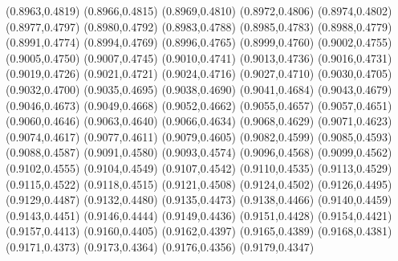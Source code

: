 \PST@Filltriangle(0.8963,0.4819)
\PST@Filltriangle(0.8966,0.4815)
\PST@Filltriangle(0.8969,0.4810)
\PST@Filltriangle(0.8972,0.4806)
\PST@Filltriangle(0.8974,0.4802)
\PST@Filltriangle(0.8977,0.4797)
\PST@Filltriangle(0.8980,0.4792)
\PST@Filltriangle(0.8983,0.4788)
\PST@Filltriangle(0.8985,0.4783)
\PST@Filltriangle(0.8988,0.4779)
\PST@Filltriangle(0.8991,0.4774)
\PST@Filltriangle(0.8994,0.4769)
\PST@Filltriangle(0.8996,0.4765)
\PST@Filltriangle(0.8999,0.4760)
\PST@Filltriangle(0.9002,0.4755)
\PST@Filltriangle(0.9005,0.4750)
\PST@Filltriangle(0.9007,0.4745)
\PST@Filltriangle(0.9010,0.4741)
\PST@Filltriangle(0.9013,0.4736)
\PST@Filltriangle(0.9016,0.4731)
\PST@Filltriangle(0.9019,0.4726)
\PST@Filltriangle(0.9021,0.4721)
\PST@Filltriangle(0.9024,0.4716)
\PST@Filltriangle(0.9027,0.4710)
\PST@Filltriangle(0.9030,0.4705)
\PST@Filltriangle(0.9032,0.4700)
\PST@Filltriangle(0.9035,0.4695)
\PST@Filltriangle(0.9038,0.4690)
\PST@Filltriangle(0.9041,0.4684)
\PST@Filltriangle(0.9043,0.4679)
\PST@Filltriangle(0.9046,0.4673)
\PST@Filltriangle(0.9049,0.4668)
\PST@Filltriangle(0.9052,0.4662)
\PST@Filltriangle(0.9055,0.4657)
\PST@Filltriangle(0.9057,0.4651)
\PST@Filltriangle(0.9060,0.4646)
\PST@Filltriangle(0.9063,0.4640)
\PST@Filltriangle(0.9066,0.4634)
\PST@Filltriangle(0.9068,0.4629)
\PST@Filltriangle(0.9071,0.4623)
\PST@Filltriangle(0.9074,0.4617)
\PST@Filltriangle(0.9077,0.4611)
\PST@Filltriangle(0.9079,0.4605)
\PST@Filltriangle(0.9082,0.4599)
\PST@Filltriangle(0.9085,0.4593)
\PST@Filltriangle(0.9088,0.4587)
\PST@Filltriangle(0.9091,0.4580)
\PST@Filltriangle(0.9093,0.4574)
\PST@Filltriangle(0.9096,0.4568)
\PST@Filltriangle(0.9099,0.4562)
\PST@Filltriangle(0.9102,0.4555)
\PST@Filltriangle(0.9104,0.4549)
\PST@Filltriangle(0.9107,0.4542)
\PST@Filltriangle(0.9110,0.4535)
\PST@Filltriangle(0.9113,0.4529)
\PST@Filltriangle(0.9115,0.4522)
\PST@Filltriangle(0.9118,0.4515)
\PST@Filltriangle(0.9121,0.4508)
\PST@Filltriangle(0.9124,0.4502)
\PST@Filltriangle(0.9126,0.4495)
\PST@Filltriangle(0.9129,0.4487)
\PST@Filltriangle(0.9132,0.4480)
\PST@Filltriangle(0.9135,0.4473)
\PST@Filltriangle(0.9138,0.4466)
\PST@Filltriangle(0.9140,0.4459)
\PST@Filltriangle(0.9143,0.4451)
\PST@Filltriangle(0.9146,0.4444)
\PST@Filltriangle(0.9149,0.4436)
\PST@Filltriangle(0.9151,0.4428)
\PST@Filltriangle(0.9154,0.4421)
\PST@Filltriangle(0.9157,0.4413)
\PST@Filltriangle(0.9160,0.4405)
\PST@Filltriangle(0.9162,0.4397)
\PST@Filltriangle(0.9165,0.4389)
\PST@Filltriangle(0.9168,0.4381)
\PST@Filltriangle(0.9171,0.4373)
\PST@Filltriangle(0.9173,0.4364)
\PST@Filltriangle(0.9176,0.4356)
\PST@Filltriangle(0.9179,0.4347)
